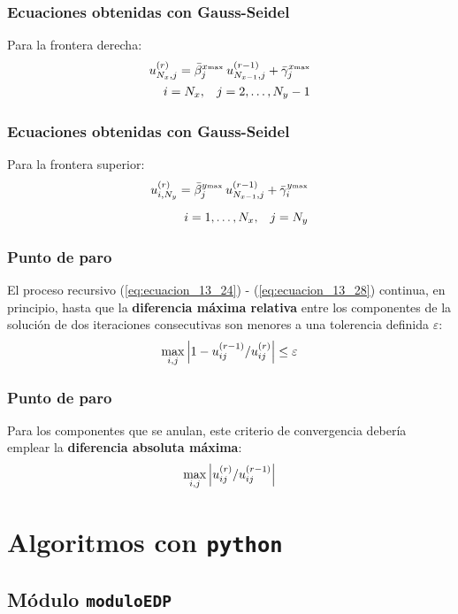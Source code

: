 \documentclass[12pt]{beamer}
\begin{document}
\begin{frame}
\frametitle{Ecuaciones obtenidas con Gauss-Seidel}
Para la frontera derecha:
\pause
\begin{align}
u_{N_{x},j}^{(r)} = \bar{\beta}_{j}^{x {\text{\tiny{max}}}} \:  u_{N_{x-1}, j}^{(r-1)} + \bar{\gamma}_{j}^{x {\text{\tiny{max}}}} \\
i = N_{x}, \hspace{0.3cm} j = 2, \ldots, N_{y} - 1 \nonumber
\label{eq:ecuacion_13_27}
\end{align}
\end{frame}
\begin{frame}
\frametitle{Ecuaciones obtenidas con Gauss-Seidel}
Para la frontera superior:
\pause
\begin{align}
u_{i, N_{y}}^{(r)} = \bar{\beta}_{j}^{y {\text{\tiny{max}}}} \:  u_{N_{x-1}, j}^{(r-1)} + \bar{\gamma}_{i}^{y {\text{\tiny{max}}}} \\[0.5em]
i = 1, \ldots, N_{x}, \hspace{0.3cm} j = N_{y} \nonumber
\label{eq:ecuacion_13_28}
\end{align}
\end{frame}
\begin{frame}
\frametitle{Punto de paro}
El proceso recursivo (\ref{eq:ecuacion_13_24}) - (\ref{eq:ecuacion_13_28}) continua, en principio, hasta que la \textbf{diferencia máxima relativa} entre los componentes de la solución de dos iteraciones consecutivas son menores a una tolerencia definida $\varepsilon$:     
\pause
\begin{align}
\max_{i,j} \abs{ 1 - u_{ij}^{(r-1)} / u_{ij}^{(r)} } \leq \varepsilon
\label{eq:ecuacion_13_29}
\end{align}
\end{frame}
\begin{frame}
\frametitle{Punto de paro}
Para los componentes que se anulan, este criterio de convergencia debería emplear la \textbf{diferencia absoluta máxima}:
\pause
\begin{align*}
\max_{i,j} \abs{ u_{ij}^{(r)} / u_{ij}^{(r-1)} }
\end{align*}
\end{frame}

\section{Algoritmos con \texttt{python}}
\subsection{Módulo \texttt{moduloEDP}}
\end{document}

